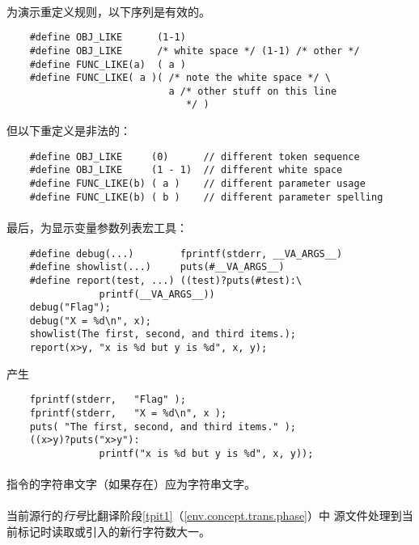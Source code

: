 \paragraph{}
\ex 为演示重定义规则，以下序列是有效的。
\begin{lstlisting}
    #define OBJ_LIKE      (1-1)
    #define OBJ_LIKE      /* white space */ (1-1) /* other */
    #define FUNC_LIKE(a)  ( a )
    #define FUNC_LIKE( a )( /* note the white space */ \
                            a /* other stuff on this line
                               */ )
\end{lstlisting}
但以下重定义是非法的：
\begin{lstlisting}
    #define OBJ_LIKE     (0)      // different token sequence
    #define OBJ_LIKE     (1 - 1)  // different white space
    #define FUNC_LIKE(b) ( a )    // different parameter usage
    #define FUNC_LIKE(b) ( b )    // different parameter spelling
\end{lstlisting}

\paragraph{}
\ex 最后，为显示变量参数列表宏工具：
\begin{lstlisting}
    #define debug(...)        fprintf(stderr, __VA_ARGS__)
    #define showlist(...)     puts(#__VA_ARGS__)
    #define report(test, ...) ((test)?puts(#test):\
                printf(__VA_ARGS__))
    debug("Flag");
    debug("X = %d\n", x);
    showlist(The first, second, and third items.);
    report(x>y, "x is %d but y is %d", x, y);
\end{lstlisting}
产生
\begin{lstlisting}
    fprintf(stderr,   "Flag" );
    fprintf(stderr,   "X = %d\n", x );
    puts( "The first, second, and third items." );
    ((x>y)?puts("x>y"):
                printf("x is %d but y is %d", x, y));
\end{lstlisting}

\constraint
\paragraph{}
指令的字符串文字（如果存在）应为字符串文字。

\semantic
\paragraph{}
当前源行的\textit{行号}比翻译阶段\ref{tpit1}（\ref{env.concept.trans.phase}）中
源文件处理到当前标记时读取或引入的新行字符数大一。

